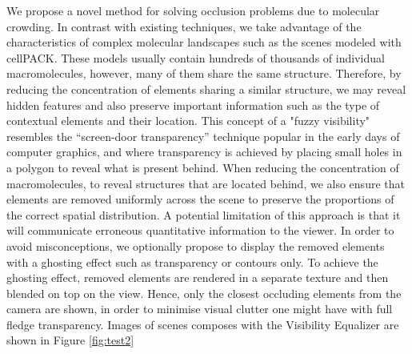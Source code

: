 We propose a novel method for solving occlusion problems due to molecular crowding.
In contrast with existing techniques, we take advantage of the characteristics of complex molecular landscapes such as the scenes modeled with cellPACK.
These models usually contain hundreds of thousands of individual macromolecules, however, many of them share the same structure.
Therefore, by reducing the concentration of elements sharing a similar structure, we may reveal hidden features and also preserve important information such as the type of contextual elements and their location.
This concept of a "fuzzy visibility" resembles the “screen-door transparency” technique popular in the early days of computer graphics, and where transparency is achieved by placing small holes in a polygon to reveal what is present behind.
When reducing the concentration of macromolecules, to reveal structures that are located behind, we also ensure that elements are removed uniformly across the scene to preserve the proportions of the correct spatial distribution.
A potential limitation of this approach is that it will communicate erroneous quantitative information to the viewer.
In order to avoid misconceptions, we optionally propose to display the removed elements with a ghosting effect such as transparency or contours only.
To achieve the ghosting effect, removed elements are rendered in a separate texture and then blended on top on the view.
Hence, only the closest occluding elements from the camera are shown, in order to minimise visual clutter one might have with full fledge transparency. 
Images of scenes composes with the Visibility Equalizer are shown in Figure \ref{fig:test2}

